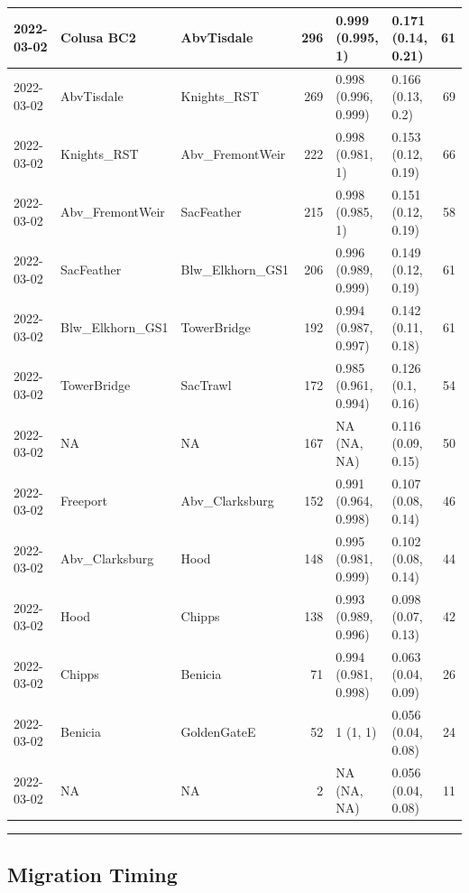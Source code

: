 \documentclass[
]{book}
\theoremstyle{definition}
\theoremstyle{definition}
\theoremstyle{definition}
\theoremstyle{definition}
\theoremstyle{remark}
\begin{document}
\begin{table}
\begin{tabular}[t]{lllrllr}
\hline
2022-03-02 & Colusa BC2 & AbvTisdale & 296 & 0.999 (0.995, 1) & 0.171 (0.14, 0.21) & 61\\
\hline
2022-03-02 & AbvTisdale & Knights\_RST & 269 & 0.998 (0.996, 0.999) & 0.166 (0.13, 0.2) & 69\\
\hline
2022-03-02 & Knights\_RST & Abv\_FremontWeir & 222 & 0.998 (0.981, 1) & 0.153 (0.12, 0.19) & 66\\
\hline
2022-03-02 & Abv\_FremontWeir & SacFeather & 215 & 0.998 (0.985, 1) & 0.151 (0.12, 0.19) & 58\\
\hline
2022-03-02 & SacFeather & Blw\_Elkhorn\_GS1 & 206 & 0.996 (0.989, 0.999) & 0.149 (0.12, 0.19) & 61\\
\hline
2022-03-02 & Blw\_Elkhorn\_GS1 & TowerBridge & 192 & 0.994 (0.987, 0.997) & 0.142 (0.11, 0.18) & 61\\
\hline
2022-03-02 & TowerBridge & SacTrawl & 172 & 0.985 (0.961, 0.994) & 0.126 (0.1, 0.16) & 54\\
\hline
2022-03-02 & NA & NA & 167 & NA (NA, NA) & 0.116 (0.09, 0.15) & 50\\
\hline
2022-03-02 & Freeport & Abv\_Clarksburg & 152 & 0.991 (0.964, 0.998) & 0.107 (0.08, 0.14) & 46\\
\hline
2022-03-02 & Abv\_Clarksburg & Hood & 148 & 0.995 (0.981, 0.999) & 0.102 (0.08, 0.14) & 44\\
\hline
2022-03-02 & Hood & Chipps & 138 & 0.993 (0.989, 0.996) & 0.098 (0.07, 0.13) & 42\\
\hline
2022-03-02 & Chipps & Benicia & 71 & 0.994 (0.981, 0.998) & 0.063 (0.04, 0.09) & 26\\
\hline
2022-03-02 & Benicia & GoldenGateE & 52 & 1 (1, 1) & 0.056 (0.04, 0.08) & 24\\
\hline
2022-03-02 & NA & NA & 2 & NA (NA, NA) & 0.056 (0.04, 0.08) & 11\\
\hline
\end{tabular}
\end{table}

\begin{center}\rule{0.5\linewidth}{0.5pt}\end{center}

\hypertarget{migration-timing-1}{%
\subsection{Migration Timing}\label{migration-timing-1}}
\end{document}

